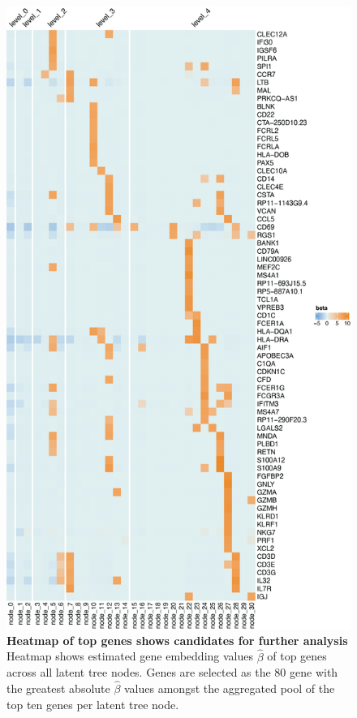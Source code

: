 \begin{figure}
    \centering
    \includegraphics[scale=0.6]{Figures/top_beta_hm.png}
    \caption{\textbf{Heatmap of top genes shows candidates for further analysis} Heatmap shows estimated gene embedding values $\hat{\beta}$ of top genes across all latent tree nodes. Genes are selected as the 80 gene with the greatest absolute $\hat{\beta}$ values amongst the aggregated pool of the top ten genes per latent tree node.}
    \label{fig:top_beta_hm}
\end{figure}

